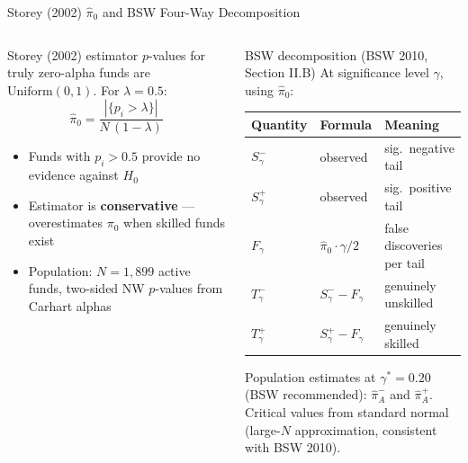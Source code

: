 \documentclass[aspectratio=169,10pt]{beamer}
\begin{document}
\begin{frame}{Storey (2002) $\hat{\pi}_0$ and BSW Four-Way Decomposition}
\begin{columns}[T]
\begin{block}{Storey (2002) estimator}
$p$-values for truly zero-alpha funds are $\mathrm{Uniform}(0,1)$. For $\lambda = 0.5$:
\[
\hat{\pi}_0 = \frac{|\{p_i > \lambda\}|}{N\,(1-\lambda)}
\]
\begin{itemize}
  \item Funds with $p_i > 0.5$ provide no evidence against $H_0$
  \item Estimator is \textbf{conservative} — overestimates $\pi_0$ when skilled funds exist
  \item Population: $N=1{,}899$ active funds, two-sided NW $p$-values from Carhart alphas
\end{itemize}
\end{block}

\begin{block}{BSW decomposition (BSW 2010, Section II.B)}
At significance level $\gamma$, using $\hat{\pi}_0$:

\medskip
\setlength{\tabcolsep}{4pt}
\begin{tabular}{lll}
\toprule
\textbf{Quantity} & \textbf{Formula} & \textbf{Meaning}\\
\midrule
$S^-_\gamma$ & observed & sig.\ negative tail \\
$S^+_\gamma$ & observed & sig.\ positive tail \\
$F_\gamma$   & $\hat{\pi}_0 \cdot \gamma/2$ & false discoveries per tail \\
$T^-_\gamma$ & $S^-_\gamma - F_\gamma$ & genuinely unskilled \\
$T^+_\gamma$ & $S^+_\gamma - F_\gamma$ & genuinely skilled \\
\bottomrule
\end{tabular}

\medskip
{\footnotesize Population estimates at $\gamma^* = 0.20$ (BSW recommended): $\hat{\pi}^-_A$ and $\hat{\pi}^+_A$.\\
Critical values from standard normal (large-$N$ approximation, consistent with BSW 2010).}
\end{block}
\end{columns}
\end{frame}
\end{document}
